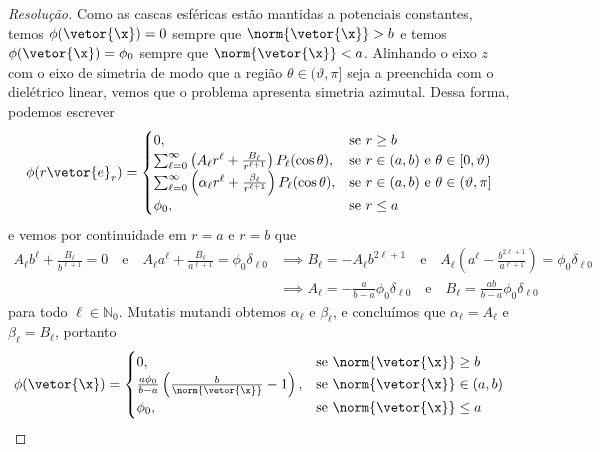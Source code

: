 \begin{proof}[Resolução]
    Como as cascas esféricas estão mantidas a potenciais constantes, temos \(\phi(\vetor{\x}) = 0\) sempre que \(\norm{\vetor{\x}} > b\) e temos \(\phi(\vetor{\x}) = \phi_0\) sempre que \(\norm{\vetor{\x}} < a\). Alinhando o eixo \(z\) com o eixo de simetria de modo que a região \(\theta \in (\vartheta, \pi]\) seja a preenchida com o dielétrico linear, vemos que o problema apresenta simetria azimutal. Dessa forma, podemos escrever
    \begin{equation*}
        \phi(r \vetor{e}_r) = \begin{cases}
            0,&\text{se }r \geq b\\
            \sum_{\ell = 0}^\infty \left(A_\ell r^\ell + \frac{B_\ell}{r^{\ell + 1}}\right)P_\ell(\cos\theta),&\text{se }r \in (a,b)\text{ e }\theta \in [0, \vartheta)\\
            \sum_{\ell = 0}^\infty \left(\alpha_\ell r^\ell + \frac{\beta_\ell}{r^{\ell + 1}}\right)P_\ell(\cos\theta),&\text{se }r \in (a,b)\text{ e }\theta \in (\vartheta,\pi]\\
            \phi_0,&\text{se }r \leq a
        \end{cases}
    \end{equation*}
    e vemos por continuidade em \(r = a\) e \(r = b\) que
    \begin{align*}
        A_\ell b^\ell + \frac{B_\ell}{b^{\ell + 1}} = 0 \quad\text{e}\quad A_\ell a^\ell + \frac{B_\ell}{a^{\ell + 1}} = \phi_0 \delta_{\ell 0}
        &\implies B_\ell = -A_\ell b^{2\ell + 1} \quad\text{e}\quad A_\ell\left(a^\ell - \frac{b^{2\ell + 1}}{a^{\ell + 1}}\right) = \phi_0 \delta_{\ell 0}\\
        &\implies A_\ell = -\frac{a}{b - a} \phi_0 \delta_{\ell 0} \quad\text{e}\quad B_\ell = \frac{ab}{b - a} \phi_0 \delta_{\ell 0}
    \end{align*}
    para todo \(\ell \in \mathbb{N}_0\). Mutatis mutandi obtemos \(\alpha_\ell\) e \(\beta_\ell\), e concluímos que \(\alpha_\ell = A_\ell\) e \(\beta_\ell = B_\ell\), portanto
    \begin{equation*}
        \phi(\vetor{\x}) = \begin{cases}
            0,&\text{se }\norm{\vetor{\x}} \geq b\\
            \frac{a\phi_0}{b - a}\left(\frac{b}{\norm{\vetor{\x}}} - 1\right),&\text{se }\norm{\vetor{\x}} \in (a,b)\\
            \phi_0,&\text{se }\norm{\vetor{\x}} \leq a
        \end{cases}

\end{equation*}
\end{proof}
